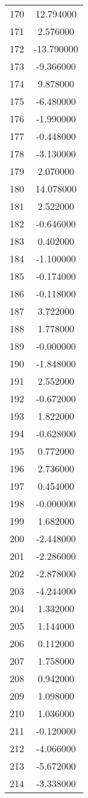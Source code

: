 \documentclass[12pt]{article}
\begin{document}
\begin{longtable}{@{}cc@{}}
170 & 12.794000 \\
171 & 2.576000 \\
172 & -13.790000 \\
173 & -9.366000 \\
174 & 9.878000 \\
175 & -6.480000 \\
176 & -1.990000 \\
177 & -0.448000 \\
178 & -3.130000 \\
179 & 2.070000 \\
180 & 14.078000 \\
181 & 2.522000 \\
182 & -0.646000 \\
183 & 0.402000 \\
184 & -1.100000 \\
185 & -0.174000 \\
186 & -0.118000 \\
187 & 3.722000 \\
188 & 1.778000 \\
189 & -0.000000 \\
190 & -1.848000 \\
191 & 2.552000 \\
192 & -0.672000 \\
193 & 1.822000 \\
194 & -0.628000 \\
195 & 0.772000 \\
196 & 2.736000 \\
197 & 0.454000 \\
198 & -0.000000 \\
199 & 1.682000 \\
200 & -2.448000 \\
201 & -2.286000 \\
202 & -2.878000 \\
203 & -4.244000 \\
204 & 1.332000 \\
205 & 1.144000 \\
206 & 0.112000 \\
207 & 1.758000 \\
208 & 0.942000 \\
209 & 1.098000 \\
210 & 1.036000 \\
211 & -0.120000 \\
212 & -4.066000 \\
213 & -5.672000 \\
214 & -3.338000 \\

\end{longtable}
\end{document}
